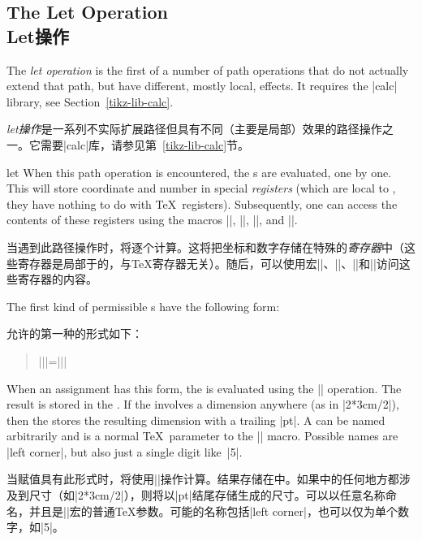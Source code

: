 \subsection{The Let Operation\\Let操作}

The \emph{let operation} is the first of a number of path operations that do
not actually extend that path, but have different, mostly local, effects.
It requires the |calc| library, see Section~\ref{tikz-lib-calc}.

\emph{let操作}是一系列不实际扩展路径但具有不同（主要是局部）效果的路径操作之一。它需要|calc|库，请参见第~\ref{tikz-lib-calc}节。

\begin{pathoperation}{let}{
        }
    When this path operation is encountered, the s are
    evaluated, one by one. This will store coordinate and number in
    special \emph{registers} (which are local to \tikzname, they have
    nothing to do with \TeX\ registers). Subsequently, one can access the
    contents of these registers using the macros |\p|, |\x|, |\y|, and
    |\n|.

    当遇到此路径操作时，将逐个计算。这将把坐标和数字存储在特殊的\emph{寄存器}中（这些寄存器是局部于\tikzname 的，与\TeX 寄存器无关）。随后，可以使用宏|\p|、|\x|、|\y|和|\n|访问这些寄存器的内容。


    The first kind of permissible s have the following form:
    
    允许的第一种的形式如下：

    \begin{quote}
        |\n||={||}|
    \end{quote}
    When an assignment has this form, the  is evaluated using the
    |\pgfmathparse| operation. The result is stored in the . If the  involves a dimension anywhere (as in
    |2*3cm/2|), then the  stores the resulting dimension
    with a trailing |pt|.  A  can be named arbitrarily
    and is a normal \TeX\ parameter to the |\n| macro. Possible names are
    |{left corner}|, but also just a single digit like~|5|.

    当赋值具有此形式时，将使用|\pgfmathparse|操作计算。结果存储在中。如果中的任何地方都涉及到尺寸（如|2*3cm/2|），则将以|pt|结尾存储生成的尺寸。可以以任意名称命名，并且是|\n|宏的普通\TeX 参数。可能的名称包括|{left corner}|，也可以仅为单个数字，如|5|。



\end{pathoperation}

